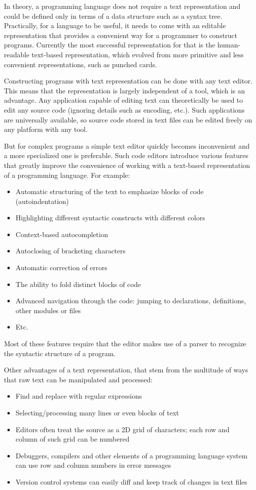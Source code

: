 In theory, a programming language does not require a text representation and
could be defined only in terms of a data structure such as a syntax
tree. Practically, for a language to be useful, it needs to come with an
editable representation that provides a convenient way for a programmer to
construct programs. Currently the most successful representation for that is the
human-readable text-based representation, which evolved from more primitive and
less convenient representations, such as punched cards\cite{columbia_history_cards, punched_cards_wikipedia}.

Constructing programs with text representation can be done with any text editor. This means that the representation is largely independent of a tool, which is an advantage. Any application capable of editing text can theoretically be used to edit any source code (ignoring details such as encoding, etc.). Such applications are universally available, so source code stored in text files can be edited freely on any platform with any tool.

But for complex programs a simple text editor quickly becomes inconvenient and a
more specialized one is preferable. Such code editors introduce various features
that greatly improve the convenience of working with a text-based representation
of a programming language. For example:
\begin{itemize}
	\item Automatic structuring of the text to emphasize blocks of code
          (autoindentation)
	\item Highlighting different syntactic constructs with different colors
	\item Context-based autocompletion
	\item Autoclosing of bracketing characters
	\item Automatic correction of errors
	\item The ability to fold distinct blocks of code
	\item Advanced navigation through the code: jumping to declarations,
          definitions, other modules or files
	\item Etc.
\end{itemize}
Most of these features require that the editor makes use of a parser to
recognize the syntactic structure of a program.

Other advantages of a text representation, that stem from the multitude of ways
that raw text can be manipulated and processed:
\begin{itemize}
	\item Find and replace with regular expressions
	\item Selecting/processing many lines or even blocks of text
	\item Editors often treat the source as a 2D grid of characters; each
          row and column of such grid can be numbered
	\item Debuggers, compilers and other elements of a programming language
          system can use row and column numbers in error messages
	\item Version control systems can easily diff and keep track of changes
          in text files
\end{itemize}


